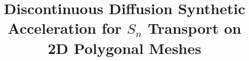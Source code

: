 \documentclass{article}
\renewcommand{\(}{\left(}
\renewcommand{\)}{\right)}
\renewcommand{\[}{\left[}
\renewcommand{\]}{\right]}
\newcommand{\sn}{\ensuremath{S_n}\xspace}
\begin{document}
\title{Discontinuous Diffusion Synthetic Acceleration for \sn Transport on
2D Polygonal Meshes}
\author{} 
\date{}
\maketitle








%



\end{document}
